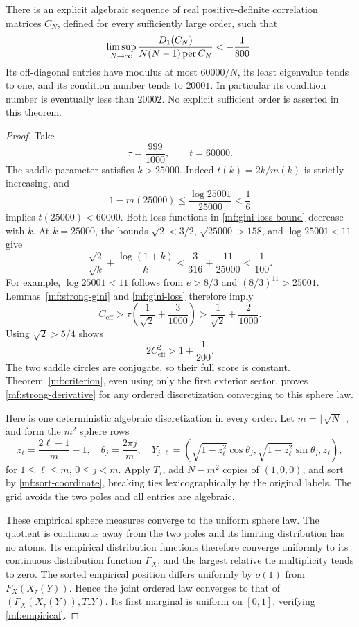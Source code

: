 \begin{theorem}
\label{mf:20002}
There is an explicit algebraic sequence of real positive-definite
correlation matrices \(C_N\), defined for every sufficiently large order,
such that
\begin{equation}\label{mf:strong-derivative}
 \limsup_{N\to\infty}
 \frac{D_1(C_N)}{N(N-1)\operatorname{per} C_N}<-\frac1{800}.
\end{equation}
Its off-diagonal entries have modulus at most \(60000/N\), its least
eigenvalue tends to one, and its condition number tends to \(20001\).
In particular its condition number is eventually less than \(20002\).
No explicit sufficient order is asserted in this theorem.
\end{theorem}
\begin{proof}
Take
\[
 \tau=\frac{999}{1000},\qquad t=60000.
\]
The saddle parameter satisfies \(k>25000\).
Indeed \(t(k)=2k/m(k)\) is strictly increasing, and
\[
 1-m(25000)\le\frac{\log25001}{25000}<\frac16
\]
implies \(t(25000)<60000\).
Both loss functions in \eqref{mf:gini-loss-bound} decrease with \(k\).
At \(k=25000\), the bounds
\(\sqrt2<3/2\), \(\sqrt{25000}>158\), and \(\log25001<11\) give
\[
 \frac{\sqrt2}{\sqrt k}+\frac{\log(1+k)}k
 <\frac3{316}+\frac{11}{25000}<\frac1{100}.
\]
For example, \(\log25001<11\) follows from \(e>8/3\) and
\((8/3)^{11}>25001\).
Lemmas~\ref{mf:strong-gini} and \ref{mf:gini-loss} therefore imply
\[
 C_{\mathrm{eff}}>
 \tau\left(\frac1{\sqrt2}+\frac3{1000}\right)
 >\frac1{\sqrt2}+\frac2{1000}.
\]
Using \(\sqrt2>5/4\) shows
\[
 2C_{\mathrm{eff}}^2>1+\frac1{200}.
\]
The two saddle circles are conjugate, so their full score is constant.
Theorem~\ref{mf:criterion}, even using only the first exterior sector,
proves \eqref{mf:strong-derivative} for any ordered discretization
converging to this sphere law.

Here is one deterministic algebraic discretization in every order.
Let \(m=\lfloor\sqrt N\rfloor\), and form the \(m^2\) sphere rows
\[
 z_\ell=\frac{2\ell-1}{m}-1,\quad
 \theta_j=\frac{2\pi j}{m},\quad
 Y_{j,\ell}=
  (\sqrt{1-z_\ell^2}\cos\theta_j,
   \sqrt{1-z_\ell^2}\sin\theta_j,z_\ell),
\]
for \(1\le\ell\le m\), \(0\le j<m\).
Apply \(T_\tau\), add \(N-m^2\) copies of \((1,0,0)\), and sort by
\eqref{mf:sort-coordinate}, breaking ties lexicographically by the
original labels. The grid avoids the two poles and all entries are
algebraic.

These empirical sphere measures converge to the uniform sphere law.
The quotient is continuous away from the two poles and its limiting
distribution has no atoms. Its empirical distribution functions therefore
converge uniformly to its continuous distribution function \(F_X\), and
the largest relative tie multiplicity tends to zero.
The sorted empirical position differs uniformly by \(o(1)\) from
\(F_X(X_\tau(Y))\). Hence the joint ordered law converges to that of
\((F_X(X_\tau(Y)),T_\tau Y)\). Its first marginal is uniform on
\([0,1]\), verifying \eqref{mf:empirical}.


\end{proof}
